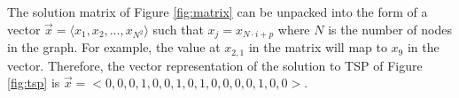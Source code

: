 	The solution matrix of Figure \ref{fig:matrix} can be unpacked into the form of a vector $\vec{x} = \langle x_1, x_2, \dots, x_{N^2} \rangle$ such that $x_j = x_{N \cdot i+p}$ where $N$ is the number of nodes in the graph. For example, the value at $x_{2,1}$ in the matrix will map to $x_9$ in the vector. Therefore, the vector representation of the solution to TSP of Figure \ref{fig:tsp} is $\vec{x} = <0,0,0,1,0,0,1,0,1,0,0,0,0,1,0,0>$.

	
